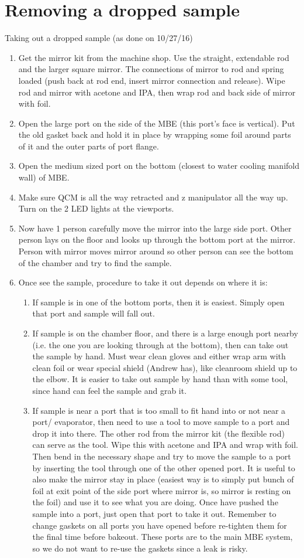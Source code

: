 \section{Removing a dropped sample}
Taking out a dropped sample (as done on 10/27/16)
\begin{enumerate}
\item	Get the mirror kit from the machine shop. Use the straight, extendable rod and the larger square mirror.  The connections of mirror to rod and spring loaded (push back at rod end, insert mirror connection and release). Wipe rod and mirror with acetone and IPA, then wrap rod and back side of mirror with foil. 
\item	Open the large port on the side of the MBE (this port’s face is vertical). Put the old gasket back and hold it in place by wrapping some foil around parts of it and the outer parts of port flange. 
\item	Open the medium sized port on the bottom (closest to water cooling manifold wall) of MBE. 
\item	Make sure QCM is all the way retracted and z manipulator all the way up. Turn on the 2 LED lights at the viewports. 
\item	Now have 1 person carefully move the mirror into the large side port. Other person lays on the floor and looks up through the bottom port at the mirror. Person with mirror moves mirror around so other person can see the bottom of the chamber and try to find the sample.
\item	Once see the sample, procedure to take it out depends on where it is:
\begin{enumerate}
\item	If sample is in one of the bottom ports, then it is easiest. Simply open that port and sample will fall out.
\item	If sample is on the chamber floor, and there is a large enough port nearby (i.e. the one you are looking through at the bottom), then can take out the sample by hand. Must wear clean gloves and either wrap arm with clean foil or wear special shield (Andrew has), like cleanroom shield up to the elbow. It is easier to take out sample by hand than with some tool, since hand can feel the sample and grab it. 
\item	If sample is near a port that is too small to fit hand into or not near a port/ evaporator, then need to use a tool to move sample to a port and drop it into there. The other rod from the mirror kit (the flexible rod) can serve as the tool. Wipe this with acetone and IPA and wrap with foil. Then bend in the necessary shape and try to move the sample to a port by inserting the tool through one of the other opened port. It is useful to also make the mirror stay in place (easiest way is to simply put bunch of foil at exit point of the side port where mirror is, so mirror is resting on the foil) and use it to see what you are doing. Once have pushed the sample into a port, just open that port to take it out. 
Remember to change gaskets on all ports you have opened before re-tighten them for the final time before bakeout. These ports are to the main MBE system, so we do not want to re-use the gaskets since a leak is risky.
\end{enumerate}
\end{enumerate}
